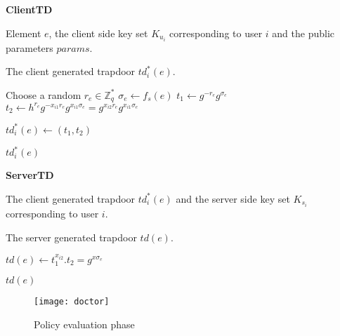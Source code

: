\documentclass[final,5p,times,twocolumn]{elsarticle}
\newcommand{\algofontsize}{\fontsize{7}{8}\selectfont}
\begin{document}
\begin{algorithm}[h]
{\algofontsize
\caption{\textbf{ClientTD}}

\label{algo:client-td}

\begin{algorithmic}[1]

\REQUIRE Element $e$, the client side key set $K_{u_i}$ corresponding to user $i$ and the public parameters $params$.

\ENSURE The client generated trapdoor $td^*_i (e)$.

\medskip

\STATE Choose a random $r_{e} \in \mathbb{Z}^*_q$ \label{line:c-td-choose}
\STATE ${\sigma}_{e} \leftarrow f_s (e)$ \label{line:c-td-sigma}
\STATE $t_1 \leftarrow g^{-r_{e}} g^{{\sigma}_{e}}$ \label{line:c-td-t1}
\STATE $t_2 \leftarrow h^{r_{e}} g^{-x_{i1}r_{e}} g^{x_{i1}{\sigma}_{e}} = g^{x_{i2}r_{e}} g^{x_{i1}{\sigma}_{e}}$ \label{line:c-td-t2}

\STATE $td^*_i (e) \leftarrow (t_1, t_2)$ \label{line:c-td-td}

\RETURN $td^*_i (e)$

\end{algorithmic}
}
\end{algorithm}





\begin{algorithm}[htp]
{\algofontsize
\caption{\textbf{ServerTD}}

\label{algo:server-td}

\begin{algorithmic}[1]

\REQUIRE The client generated trapdoor $td^*_i (e)$ and the server side key set $K_{s_i}$ corresponding to user $i$.

\ENSURE The server generated trapdoor $td(e)$.

\medskip

\STATE $td(e) \leftarrow t_1^{x_{i2}} . t_2 = g^{x{\sigma}_{e}}$ \label{line:s-td-calculate}

\RETURN $td(e)$

\end{algorithmic}
}
\end{algorithm}

\begin{figure}
\centering
\texttt{[image: doctor]}
\caption{Policy evaluation phase}
\label{fig:doctor}
\end{figure}
\end{document}
